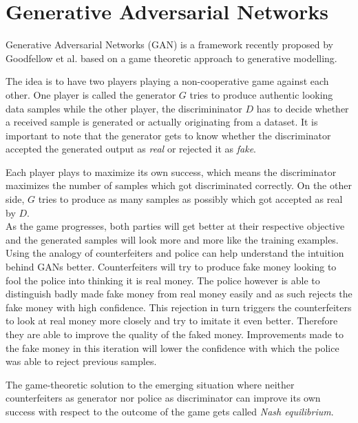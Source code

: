 \section{Generative Adversarial Networks}
\label{sec:gan}

Generative Adversarial Networks (GAN) is a framework recently proposed by Goodfellow et al. \cite{gan:2014} based on a game theoretic approach to generative modelling.
 
The idea is to have two players playing a non-cooperative game against each other.
One player is called the generator $G$ tries to produce authentic looking data samples while the other player, the discrimininator $D$ has to decide whether a received sample is generated or actually originating from a dataset.
It is important to note that the generator gets to know whether the discriminator accepted the generated output as \emph{real} or rejected it as \emph{fake}.

Each player plays to maximize its own success, which means the discriminator maximizes the number of samples which got discriminated correctly.
On the other side, $G$ tries to produce as many samples as possibly which got accepted as real by $D$.\\

As the game progresses, both parties will get better at their respective objective and the generated samples will look more and more like the training examples.\\

Using the analogy of counterfeiters and police can help understand the intuition behind GANs better.
Counterfeiters will try to produce fake money looking to fool the police into thinking it is real money.
The police however is able to distinguish badly made fake money from real money easily and as such rejects the fake money with high confidence.
This rejection in turn triggers the counterfeiters to look at real money more closely and try to imitate it even better. Therefore they are able to improve the quality of the faked money. Improvements made to the fake money in this iteration will lower the confidence with which the police was able to reject previous samples.

The game-theoretic solution to the emerging situation where neither counterfeiters as generator nor police as discriminator can improve its own success with respect to the outcome of the game gets called \emph{Nash equilibrium}\cite{game_theory:1994}.

